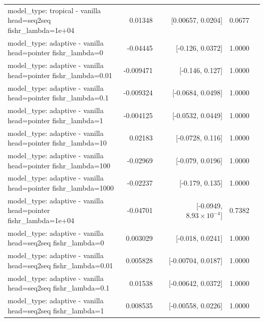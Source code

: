 \documentclass[10pt]{article}
\makeatletter
\newcommand{\stackcell}[1]{\begin{tabular}[t]{@{}l@{}}#1\end{tabular}}
\makeatother
\begin{document}
{\begin{longtable}{lrrrl}
\stackcell{model\_type: tropical - vanilla\\\footnotesize head=seq2seq fishr\_lambda=1e+04 } & 0.01348 & [0.00657, 0.0204] & 0.0677 & \\
\stackcell{model\_type: adaptive - vanilla\\\footnotesize head=pointer fishr\_lambda=0 } & -0.04445 & [-0.126, 0.0372] & 1.0000 & \\
\stackcell{model\_type: adaptive - vanilla\\\footnotesize head=pointer fishr\_lambda=0.01 } & -0.009471 & [-0.146, 0.127] & 1.0000 & \\
\stackcell{model\_type: adaptive - vanilla\\\footnotesize head=pointer fishr\_lambda=0.1 } & -0.009324 & [-0.0684, 0.0498] & 1.0000 & \\
\stackcell{model\_type: adaptive - vanilla\\\footnotesize head=pointer fishr\_lambda=1 } & -0.004125 & [-0.0532, 0.0449] & 1.0000 & \\
\stackcell{model\_type: adaptive - vanilla\\\footnotesize head=pointer fishr\_lambda=10 } & 0.02183 & [-0.0728, 0.116] & 1.0000 & \\
\stackcell{model\_type: adaptive - vanilla\\\footnotesize head=pointer fishr\_lambda=100 } & -0.02969 & [-0.079, 0.0196] & 1.0000 & \\
\stackcell{model\_type: adaptive - vanilla\\\footnotesize head=pointer fishr\_lambda=1000 } & -0.02237 & [-0.179, 0.135] & 1.0000 & \\
\stackcell{model\_type: adaptive - vanilla\\\footnotesize head=pointer fishr\_lambda=1e+04 } & -0.04701 & [-0.0949, $8.93\times10^{-4}$] & 0.7382 & \\
\stackcell{model\_type: adaptive - vanilla\\\footnotesize head=seq2seq fishr\_lambda=0 } & 0.003029 & [-0.018, 0.0241] & 1.0000 & \\
\stackcell{model\_type: adaptive - vanilla\\\footnotesize head=seq2seq fishr\_lambda=0.01 } & 0.005828 & [-0.00704, 0.0187] & 1.0000 & \\
\stackcell{model\_type: adaptive - vanilla\\\footnotesize head=seq2seq fishr\_lambda=0.1 } & 0.01538 & [-0.00642, 0.0372] & 1.0000 & \\
\stackcell{model\_type: adaptive - vanilla\\\footnotesize head=seq2seq fishr\_lambda=1 } & 0.008535 & [-0.00558, 0.0226] & 1.0000 & \\

\end{longtable}}
\end{document}
